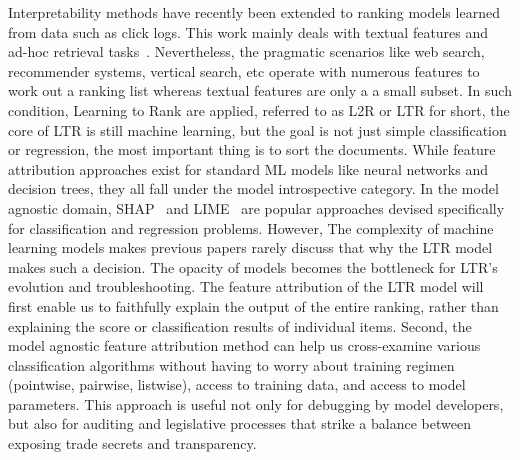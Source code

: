 Interpretability methods have recently been extended to ranking models learned from data such as click logs. This work mainly deals with textual features and ad-hoc retrieval tasks~\cite{Singhexs:2019, singh2020model, Fernando:2019:SIN:3331184.3331312}. Nevertheless, the pragmatic scenarios like web search, recommender systems, vertical search, etc operate with numerous features to work out a ranking list whereas textual features are only a a small subset. In such condition, Learning to Rank are applied, referred to as L2R or LTR for short, the core of LTR is still machine learning, but the goal is not just simple classification or regression, the most important thing is to sort the documents. While feature attribution approaches exist for standard ML models like neural networks and decision trees, they all fall under the model introspective category. In the model agnostic domain, SHAP~\cite{lundberg2017unified} and LIME~\cite{ribeiro2016i} are popular approaches devised specifically for classification and regression problems. 
However, The complexity of machine learning models makes previous papers rarely discuss that why the LTR model makes such a decision. The opacity of models becomes the bottleneck for LTR's evolution and troubleshooting. 
The feature attribution of the LTR model will first enable us to faithfully explain the output of the entire ranking, rather than explaining the score or classification results of individual items. Second, the model agnostic feature attribution method can help us cross-examine various classification algorithms without having to worry about training regimen (pointwise, pairwise, listwise), access to training data, and access to model parameters. This approach is useful not only for debugging by model developers, but also for auditing and legislative processes that strike a balance between exposing trade secrets and transparency.

